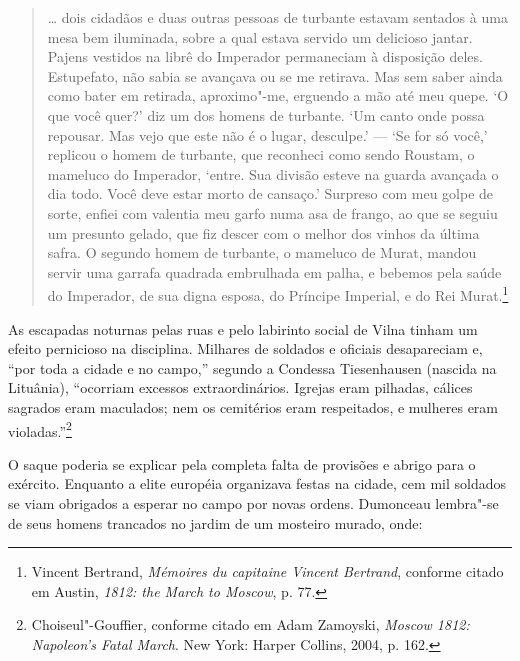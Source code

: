 \begin{quote}
\ldots{} dois cidadãos e duas outras pessoas de turbante estavam
sentados à uma mesa bem iluminada, sobre a qual estava servido um
delicioso jantar. Pajens vestidos na librê do Imperador permaneciam à
disposição deles. Estupefato, não sabia se avançava ou se me retirava.
Mas sem saber ainda como bater em retirada, aproximo"-me, erguendo a mão
até meu quepe. `O que você quer?' diz um dos homens de turbante. `Um
canto onde possa repousar. Mas vejo que este não é o lugar, desculpe.' ---
`Se for só você,' replicou o homem de turbante, que reconheci como sendo
Roustam, o mameluco do Imperador, `entre. Sua divisão esteve na guarda
avançada o dia todo. Você deve estar morto de cansaço.' Surpreso com meu
golpe de sorte, enfiei com valentia meu garfo numa asa de frango, ao que
se seguiu um presunto gelado, que fiz descer com o melhor dos vinhos da
última safra. O segundo homem de turbante, o mameluco de Murat, mandou
servir uma garrafa quadrada embrulhada em palha, e bebemos pela saúde do
Imperador, de sua digna esposa, do Príncipe Imperial, e do Rei
Murat.\footnote{Vincent Bertrand, \emph{Mémoires du capitaine Vincent
  Bertrand}, conforme citado em Austin, \emph{1812: the March to
  Moscow}, p. 77.}
\end{quote}  

As escapadas noturnas pelas ruas e pelo labirinto social de Vilna tinham
um efeito pernicioso na disciplina. Milhares de soldados e oficiais
desapareciam e, ``por toda a cidade e no campo,'' segundo a Condessa
Tiesenhausen (nascida na Lituânia), ``ocorriam excessos extraordinários.
Igrejas eram pilhadas, cálices sagrados eram maculados; nem os
cemitérios eram respeitados, e mulheres eram violadas.''\footnote{Choiseul"-Gouffier,
  conforme citado em Adam Zamoyski, \emph{Moscow 1812: Napoleon's Fatal
  March}. New York: Harper Collins, 2004, p. 162.}

O saque poderia se explicar pela completa falta de provisões e abrigo
para o exército. Enquanto a elite européia organizava festas na cidade,
cem mil soldados se viam obrigados a esperar no campo por novas ordens.
Dumonceau lembra"-se de seus homens trancados no jardim de um mosteiro
murado, onde:

